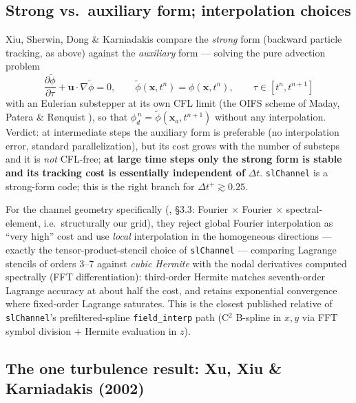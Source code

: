\documentclass[11pt,a4paper]{article}
\newcommand{\dtp}{\Delta t^{+}}
\newcommand{\bu}{\mathbf{u}}
\newcommand{\bx}{\mathbf{x}}
\begin{document}
\subsection{Strong vs.\ auxiliary form; interpolation choices}

Xiu, Sherwin, Dong \& Karniadakis \cite{xiu05} compare the \emph{strong} form
(backward particle tracking, as above) against the \emph{auxiliary} form ---
solving the pure advection problem
\begin{equation}
\frac{\partial\tilde\phi}{\partial\tau} + \bu\cdot\nabla\tilde\phi = 0,
\qquad \tilde\phi(\bx,t^{n})=\phi(\bx,t^{n}),
\qquad \tau\in[t^{n},t^{n+1}]
\label{eq:oifs}
\end{equation}
with an Eulerian substepper at its own CFL limit (the OIFS scheme of Maday,
Patera \& R{\o}nquist \cite{mpr90}), so that
$\phi_d^{\,n}=\tilde\phi(\bx_a,t^{n+1})$ without any interpolation. Verdict:
at intermediate steps the auxiliary form is preferable (no interpolation
error, standard parallelization), but its cost grows with the number of
substeps and it is \emph{not} CFL-free; \textbf{at large time steps only the
strong form is stable and its tracking cost is essentially independent of}
$\Delta t$. \texttt{slChannel} is a strong-form code; this is the right
branch for $\dtp\gtrsim0.25$.

For the channel geometry specifically (\cite{xiu05}, \S3.3: Fourier
$\times$ Fourier $\times$ spectral-element, i.e.\ structurally our grid),
they reject global Fourier interpolation as ``very high'' cost and use
\emph{local} interpolation in the homogeneous directions --- exactly the
tensor-product-stencil choice of \texttt{slChannel} --- comparing Lagrange
stencils of orders 3--7 against \emph{cubic Hermite} with the nodal
derivatives computed spectrally (FFT differentiation):
third-order Hermite matches seventh-order Lagrange accuracy at about half
the cost, and retains exponential convergence where fixed-order Lagrange
saturates. This is the closest published relative of \texttt{slChannel}'s
prefiltered-spline \texttt{field\_interp} path (C$^2$ B-spline in $x,y$ via
FFT symbol division $+$ Hermite evaluation in $z$).

\subsection{The one turbulence result: Xu, Xiu \& Karniadakis (2002)}
\end{document}

